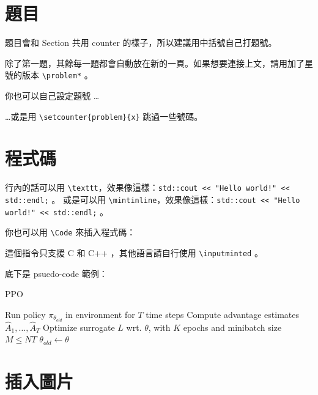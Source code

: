 \documentclass{homework}
\begin{document}
\section{題目}

題目會和 Section 共用 counter 的樣子，所以建議用中括號自己打題號。

\problem*
除了第一題，其餘每一題都會自動放在新的一頁。如果想要連接上文，請用加了星號的版本 \verb|\problem*| 。

\problem*[Rec--2.1]
你也可以自己設定題號 \dots

\setcounter{problem}{7}
\problem*
\dots 或是用 \verb|\setcounter{problem}{x}| 跳過一些號碼。

\setcounter{section}{3}

\section{程式碼}

行內的話可以用 \verb|\texttt|，效果像這樣：\texttt{std::cout << "Hello world!" << std::endl;} 。
或是可以用 \verb|\mintinline|，效果像這樣：\texttt{std::cout << "Hello world!" << std::endl;} 。

你也可以用 \verb|\Code| 來插入程式碼：


這個指令只支援 C 和 C++ ，其他語言請自行使用 \verb|\inputminted| 。

底下是 psuedo-code 範例：

\begin{algorithm}[H]
	\caption{PPO}
	\label{alg:ppo}
	\begin{algorithmic}[1]
		\State Run policy $\pi_{\theta_{old}}$ in environment for $T$ time steps
		\State Compute advantage estimates $\hat{A}_{1},\ldots,\hat{A}_{T}$
		\EndFor
		\State Optimize surrogate $L$ wrt. $\theta$, with $K$ epochs and minibatch size $M\leq NT$
		\State $\theta_{old}\leftarrow\theta$
		\EndFor
	\end{algorithmic}
\end{algorithm}

\section{插入圖片}
\end{document}
